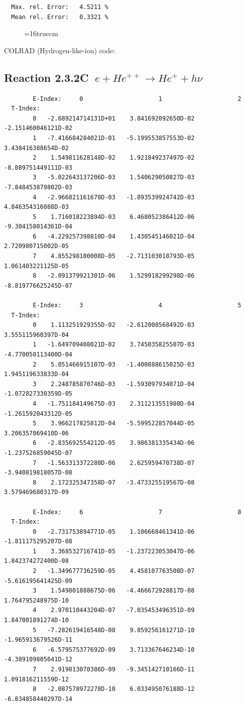 \documentclass[12pt,dvips]{article}
\begin{document}
\begin{small}
\begin{verbatim}
  Max. rel. Error:   4.5211 %
  Mean rel. Error:   0.3321 %

\end{verbatim}\end{small}
\begin{figure} \label{2.3.2B1}
\epsfxsize=16truecm
\end{figure}
\newpage
COLRAD (Hydrogen-like-ion) code:
\subsection{
Reaction 2.3.2C   $\  e + He^{++} \rightarrow  He^+ + h\nu$
}

\begin{small}\begin{verbatim}
        E-Index:     0                     1                     2
  T-Index:
        0   -2.689214714131D+01    3.841692092650D-02   -2.151460046121D-02
        1   -7.416684284021D-01   -5.199553857553D-02    3.438416388654D-02
        2    1.549811628148D-02    1.921849237497D-02   -8.089751449111D-03
        3   -5.022643137206D-03    1.540629050827D-03   -7.848453879802D-03
        4   -2.966821161678D-03   -1.893539924742D-03    4.846354316088D-03
        5    1.716018223894D-03    6.468052386412D-06   -9.304158014361D-04
        6   -4.229257398810D-04    1.430545146021D-04    2.720980715002D-05
        7    4.855298100008D-05   -2.713103018793D-05    1.061403221125D-05
        8   -2.091379921301D-06    1.529918299298D-06   -8.819776625245D-07

        E-Index:     3                     4                     5
  T-Index:
        0    1.113251929355D-02   -2.612008568492D-03    3.555115960397D-04
        1   -1.649709408021D-02    3.745035825507D-03   -4.770050113400D-04
        2    5.051466915107D-03   -1.400888615025D-03    1.945119633833D-04
        3    2.248785870746D-03   -1.593097934071D-04   -1.072827330359D-05
        4   -1.751184149675D-03    2.311213551980D-04   -1.261592043312D-05
        5    3.966217825812D-04   -5.599522857044D-05    3.206357069410D-06
        6   -2.835692554212D-05    3.986381335434D-06   -1.237526859045D-07
        7   -1.563313372280D-06    2.625959470738D-07   -3.940819818057D-08
        8    2.172325347358D-07   -3.473325519567D-08    3.579469680317D-09

        E-Index:     6                     7                     8
  T-Index:
        0   -2.731753894771D-05    1.106668461341D-06   -1.811175295207D-08
        1    3.368532716741D-05   -1.237223053047D-06    1.842374272400D-08
        2   -1.349677736259D-05    4.458107763508D-07   -5.616195641425D-09
        3    1.549801888675D-06   -4.466672928817D-08    1.764795248975D-10
        4    2.970110443204D-07   -7.035453496351D-09    1.847001891274D-10
        5   -7.282619416548D-08    9.859256161271D-10   -1.965913679526D-11
        6   -6.579575377692D-09    3.713367646234D-10   -4.389109805641D-12
        7    2.919813070386D-09   -9.345142710166D-11    1.091816211559D-12
        8   -2.087578972278D-10    6.033495076188D-12   -6.834858440297D-14


\end{verbatim}
\end{small}
\end{document}
